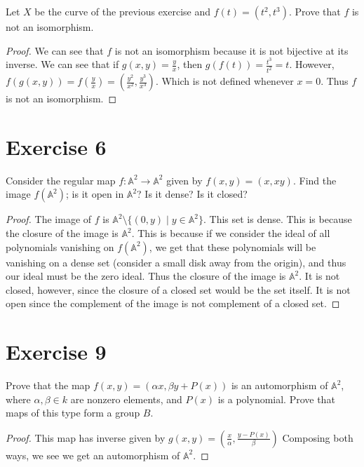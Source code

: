 \documentclass[12pt]{article}
\begin{document}
Let $X$ be the curve of the previous exercise and $f(t) = (t^2,t^3)$. Prove that $f$ is not an
isomorphism.

\begin{proof}

  We can see that $f$ is not an isomorphism because it is not bijective at its inverse. We can see
  that if $g(x,y) = \frac{y}{x}$, then $g(f(t)) = \frac{t^3}{t^2} = t$. However, 
  $f(g(x,y)) = f(\frac{y}{x}) = (\frac{y^2}{x^2},\frac{y^3}{x^3})$. Which is not defined whenever
  $x=0$. Thus $f$ is not an isomorphism.

\end{proof}


\section*{Exercise 6}

Consider the regular map $f: \mathbb{A}^2 \rightarrow \mathbb{A}^2$ given by $f(x,y) = (x,xy)$. Find
the image $f(\mathbb{A}^2)$; is it open in $\mathbb{A}^2$? Is it dense? Is it closed?


\begin{proof}

  The image of $f$ is $\mathbb{A}^2 \setminus \{(0,y) \mid y \in \mathbb{A}^2\}$. This set is dense.
  This is because the closure of the image is $\mathbb{A}^2$. This is because if we
  consider the ideal of all polynomials vanishing on $f(\mathbb{A}^2)$, we get that these
  polynomials will be vanishing on a dense set (consider a small disk away from the origin), 
  and thus our ideal must be the zero ideal. Thus the closure of the image is $\mathbb{A}^2$. It is
  not closed, however, since the closure of a closed set would be the set itself. It is not open
  since the complement of the image is not complement of a closed set.

\end{proof}


\section*{Exercise 9}

Prove that the map $f(x,y) = (\alpha x , \beta y + P(x))$ is an automorphism of $\mathbb{A}^2$,
where $\alpha, \beta \in k$ are nonzero elements, and $P(x)$ is a polynomial. Prove that maps of
this type form a group $B$.

\begin{proof} 

  This map has inverse given by $g(x,y) = \left( \frac{x}{\alpha} , \frac{y - P(x)}{\beta} \right)$
  Composing both ways, we see we get an automorphism of $\mathbb{A}^2$. 
  

\end{proof}
\end{document}
